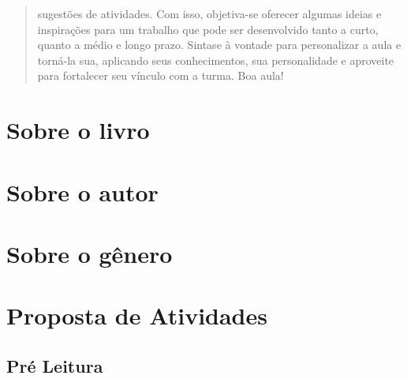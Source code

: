 \documentclass[11pt]{extarticle}
\begin{document}
\begin{abstract}
sugestões de atividades. Com isso, objetiva-se oferecer algumas ideias e inspirações para um trabalho que pode ser desenvolvido tanto a curto, quanto a médio e longo prazo. Sintase à vontade para personalizar a aula e torná-la sua, aplicando seus conhecimentos, sua personalidade e aproveite para fortalecer seu vínculo com a turma. Boa aula! 

\end{abstract}

\section{Sobre o livro}

\section{Sobre o autor}

\section{Sobre o gênero}

\section{Proposta de Atividades}
\subsection{Pré Leitura}

\end{document}
